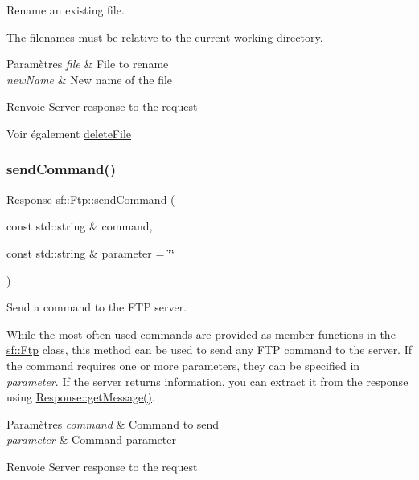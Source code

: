 Rename an existing file. 

The filenames must be relative to the current working directory.


\begin{DoxyParams}{Paramètres}
{\em file} & File to rename \\
\hline
{\em new\+Name} & New name of the file\\
\hline
\end{DoxyParams}
\begin{DoxyReturn}{Renvoie}
Server response to the request
\end{DoxyReturn}
\begin{DoxySeeAlso}{Voir également}
\hyperlink{classsf_1_1Ftp_a8aa272b0eb7769a850006e70fcad370f}{delete\+File} 
\end{DoxySeeAlso}
\mbox{\label{classsf_1_1Ftp_a44e095103ecbce175a33eaf0820440ff}} 
\subsubsection{\texorpdfstring{send\+Command()}{sendCommand()}}
{\footnotesize\ttfamily \hyperlink{classsf_1_1Ftp_1_1Response}{Response} sf\+::\+Ftp\+::send\+Command (\begin{DoxyParamCaption}\item[{const std\+::string \&}]{command,  }\item[{const std\+::string \&}]{parameter = {\ttfamily \char`\"{}\char`\"{}} }\end{DoxyParamCaption})}



Send a command to the F\+TP server. 

While the most often used commands are provided as member functions in the \hyperlink{classsf_1_1Ftp}{sf\+::\+Ftp} class, this method can be used to send any F\+TP command to the server. If the command requires one or more parameters, they can be specified in {\itshape parameter}. If the server returns information, you can extract it from the response using \hyperlink{classsf_1_1Ftp_1_1Response_a4af82a0b3620c90558390e1f600abc05}{Response\+::get\+Message()}.


\begin{DoxyParams}{Paramètres}
{\em command} & Command to send \\
\hline
{\em parameter} & Command parameter\\
\hline
\end{DoxyParams}
\begin{DoxyReturn}{Renvoie}
Server response to the request 
\end{DoxyReturn}
\mbox{\label{classsf_1_1Ftp_a46d6e15cddd719288b5a08b685e11765}} 
